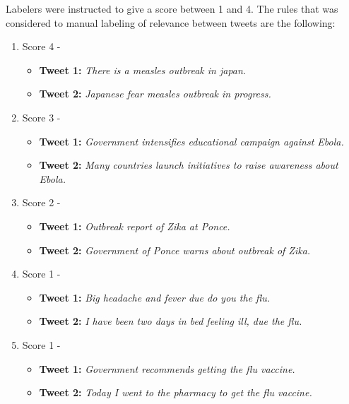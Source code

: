 \documentclass[12pt]{report}
\begin{document}
Labelers were instructed to give a score between 1 and 4. The rules that was considered to manual labeling of relevance between tweets are the following:

\begin{enumerate}
	\item Score 4 - 
	\begin{itemize}
		\item \textbf{Tweet 1:} \textit{There is a measles outbreak in japan.}
		\item \textbf{Tweet 2:} \textit{Japanese fear measles outbreak in progress.}
	\end{itemize}

	\item Score 3 - 
	\begin{itemize}
		\item \textbf{Tweet 1:} \textit{Government intensifies educational campaign against Ebola.}
		\item \textbf{Tweet 2:} \textit{Many countries launch initiatives to raise awareness about Ebola.}
	\end{itemize}

	\item Score 2 - 
	\begin{itemize}
		\item \textbf{Tweet 1:} \textit{Outbreak report of Zika at Ponce.}
		\item \textbf{Tweet 2:} \textit{Government of Ponce warns about outbreak of Zika.}
	\end{itemize}


	\item Score  1 - 
	\begin{itemize}
		\item \textbf{Tweet 1:} \textit{Big headache and fever due do you the flu.}
		\item \textbf{Tweet 2:} \textit{I have been two days in bed feeling ill, due the flu.}
	\end{itemize}


	\item Score 1 - 
	\begin{itemize}
		\item \textbf{Tweet 1:} \textit{Government recommends getting the flu vaccine.}
		\item \textbf{Tweet 2:} \textit{Today I went to the pharmacy to get the flu vaccine.}
	\end{itemize}
\end{enumerate}
\end{document}
